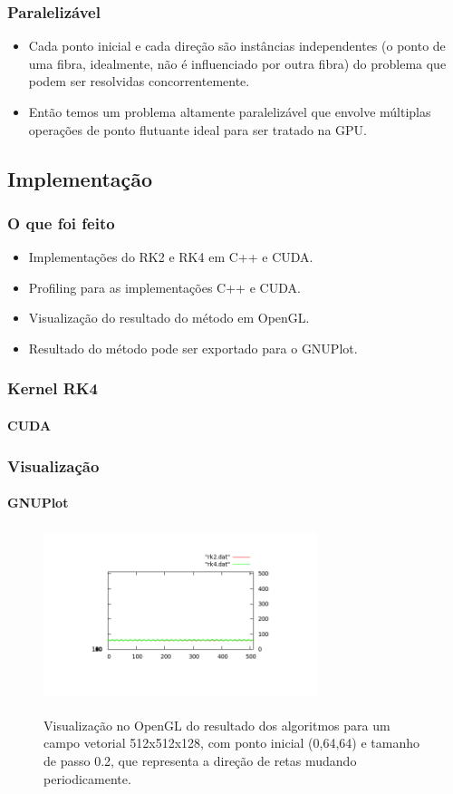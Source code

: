 \documentclass[brazil, 10pt]{beamer}
\begin{document}
\begin{frame}
  \frametitle{Paralelizável}
  
  \begin{itemize}
    \item Cada ponto inicial e cada direção são instâncias independentes (o ponto de uma fibra, idealmente, não é influenciado por outra fibra) do problema que podem ser resolvidas concorrentemente.
    \item Então temos um problema altamente paralelizável que envolve múltiplas operações de ponto flutuante ideal para ser tratado na GPU.
  \end{itemize}
\end{frame}

\subsection{Implementação}
\begin{frame}
  \frametitle{O que foi feito}

  \begin{itemize}
    \item Implementações do RK2 e RK4 em C++ e CUDA.
    \item Profiling para as implementações C++ e CUDA.
    \item Visualização do resultado do método em OpenGL.
    \item Resultado do método pode ser exportado para o GNUPlot.
  \end{itemize}
\end{frame}

\begin{frame}
  \frametitle{Kernel RK4}
  \framesubtitle{CUDA}
  
  
\end{frame}

\begin{frame}
  \frametitle{Visualização}
  \framesubtitle{GNUPlot}
  
    \begin{figure}
    \begin{center}
      \includegraphics[width=80mm, height=50mm]{img/gnuplot-lines.png}
      \label{fig:2}
      \caption{Visualização no OpenGL do resultado dos algoritmos para um campo vetorial 512x512x128, com ponto inicial (0,64,64) e tamanho de passo 0.2, que representa a direção de retas mudando periodicamente.}
    \end{center}
  \end{figure}
\end{frame}
\end{document}
